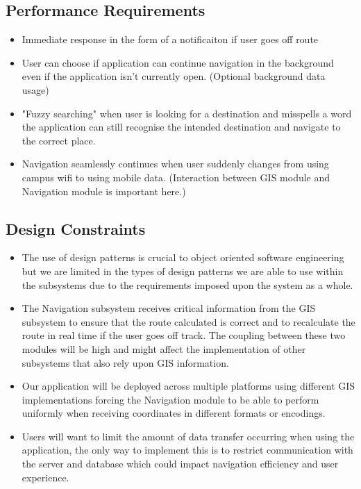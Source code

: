 	\subsection{Performance Requirements}
	\begin{itemize}
		\small
		\item Immediate response in the form of a notificaiton if user goes off route
		\item User can choose if application can continue navigation in the background even if the application isn't currently open. (Optional background data usage)
		\item "Fuzzy searching" when user is looking for a destination and misspells a word the application can still recognise the intended destination and navigate to the correct place.
		\item Navigation seamlessly continues when user suddenly changes from using campus wifi to using mobile data. (Interaction between GIS module and Navigation module is important here.)
	\end{itemize}
	
	\subsection{Design Constraints}
	\begin{itemize}
		\small
		\item The use of design patterns is crucial to object oriented software engineering but we are limited 
			in the types of design patterns we are able to use within the subsystems due to the requirements 
			imposed upon the system as a whole.
		\item The Navigation subsystem receives critical information from the GIS subsystem to ensure that the route
			calculated is correct and to recalculate the route in real time if the user goes off track. The coupling between these two modules will be high and might affect the implementation of other subsystems that also rely upon GIS information.
		\item Our application will be deployed across multiple platforms using different GIS implementations forcing the Navigation module to be able to perform uniformly when receiving coordinates in different formats or encodings.
		\item Users will want to limit the amount of data transfer occurring when using the application, the only way to implement this is to restrict communication with the server and database which could impact navigation efficiency and user experience.
	\end{itemize}
	
